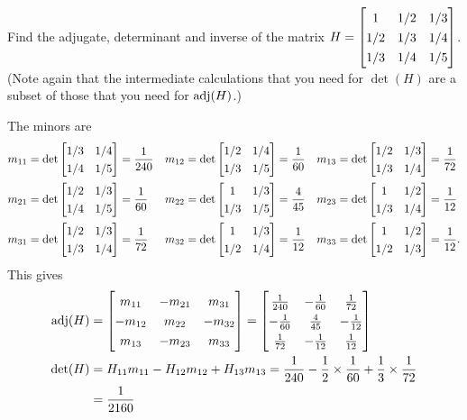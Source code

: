 \documentclass[a4paper]{amsart}
\renewenvironment{solution}{\SolutionInline}{\endSolutionInline}
\begin{document}
\begin{exercise}\label{ex-adjugate-hilbert}
 Find the adjugate, determinant and inverse of the matrix
 $H=\bbm 1&1/2&1/3 \\ 1/2&1/3&1/4 \\ 1/3&1/4&1/5 \ebm$.  \\
 (Note again that the intermediate calculations that you need for
 $\det(H)$ are a subset of those that you need for $\operatorname{adj}(H)$.)
\end{exercise}
\begin{solution}
 The minors are 
 \begin{align*}
  m_{11} &= \det\bbm 1/3&1/4 \\ 1/4&1/5 \ebm = \frac{1}{240} &
  m_{12} &= \det\bbm 1/2&1/4 \\ 1/3&1/5 \ebm = \frac{1}{60} &
  m_{13} &= \det\bbm 1/2&1/3 \\ 1/3&1/4 \ebm = \frac{1}{72} \\
  m_{21} &= \det\bbm 1/2&1/3 \\ 1/4&1/5 \ebm = \frac{1}{60} &
  m_{22} &= \det\bbm 1  &1/3 \\ 1/3&1/5 \ebm = \frac{4}{45} &
  m_{23} &= \det\bbm 1  &1/2 \\ 1/3&1/4 \ebm = \frac{1}{12} \\
  m_{31} &= \det\bbm 1/2&1/3 \\ 1/3&1/4 \ebm = \frac{1}{72} &
  m_{32} &= \det\bbm 1  &1/3 \\ 1/2&1/4 \ebm = \frac{1}{12} &
  m_{33} &= \det\bbm 1  &1/2 \\ 1/2&1/3 \ebm = \frac{1}{12}.
 \end{align*}
 This gives
 \begin{align*} 
  \adj(H) &= \bbm  m_{11} & -m_{21} &  m_{31} \\
                  -m_{12} &  m_{22} & -m_{32} \\
                   m_{13} & -m_{23} &  m_{33} \ebm 
           = \renewcommand{\arraystretch}{1.3} \bbm 
                   \frac{1}{240} & -\frac{1}{60} & \frac{1}{72} \\
                  -\frac{1}{60} &  \frac{4}{45} & -\frac{1}{12} \\
                   \frac{1}{72} & -\frac{1}{12} &  \frac{1}{12} \ebm
                   \\
  \det(H) &= H_{11}m_{11} - H_{12}m_{12} + H_{13}m_{13} 
           = \frac{1}{240} - \frac{1}{2}\tm\frac{1}{60} +
             \frac{1}{3}\tm\frac{1}{72} \\
          &= \frac{1}{2160} \\

\end{align*}
\end{solution}
\end{document}
